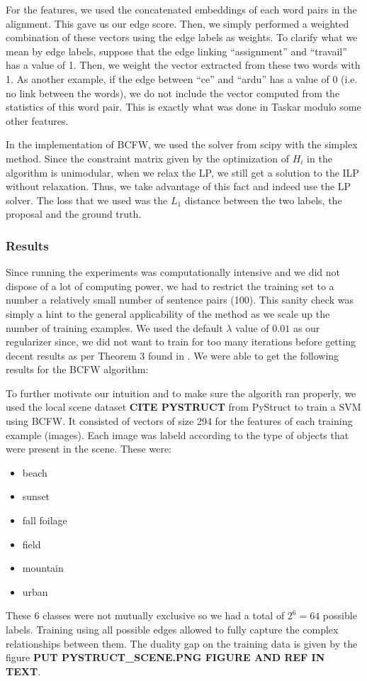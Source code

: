 For the features, we used the concatenated
embeddings of each word pairs in the alignment. This gave us our edge score.
Then, we simply performed a weighted combination of these vectors using the edge
labels as weights. To clarify what we mean by edge labels, suppose that the edge
linking ``assignment'' and ``travail'' has a value of 1. Then, we weight the
vector extracted from these two words with 1. As another example, if the edge
between ``ce'' and ``ardu'' has a value of 0 (i.e. no link between the words),
we do not include the vector computed from the statistics of this word pair.
This is exactly what was done in Taskar
\cite{taskarStructuredPredictionExtragradient} modulo some other features.

In the implementation of BCFW, we used the solver from scipy with the simplex
method. Since the constraint matrix given by the optimization of $H_i$ in the
algorithm is unimodular, when we relax the LP, we still get a solution to the
ILP without relaxation. Thus, we take advantage of this fact and indeed use the
LP solver. The loss that we used was the $L_1$
distance between the two labels, the proposal and the ground truth.

\subsubsection{Results}
Since running the experiments was computationally intensive and we did not dispose of a
lot of computing power, we had to restrict the training set to a number a relatively small
number of sentence pairs (100). This sanity check was simply a hint to the general applicability 
of the method as we scale up the number of training examples. We used the default $\lambda$ value
of $0.01$ as our regularizer since, we did not want to train for too many iterations before
getting decent results as per Theorem 3 found in
\citet{lacoste-julienBlockCoordinateFrankWolfeOptimization2013}. We were able to
get the following results for the BCFW algorithm:




To further motivate our intuition and to make sure the algorith ran properly, we used
the local scene dataset \textbf{CITE PYSTRUCT} from PyStruct to train a SVM using BCFW. It consisted of vectors
of size 294 for the features of each training example (images). Each image was labeld according
to the type of objects that were present in the scene. These were:
\begin{itemize}
  \item beach
  \item sunset
  \item fall foilage
  \item field
  \item mountain
  \item urban
\end{itemize}
These 6 classes were not mutually exclusive so we had a total of $2^6=64$ possible labels. Training using
all possible edges allowed to fully capture the complex relationships between them. The duality gap on the 
training data is given by the figure \textbf{PUT PYSTRUCT_SCENE.PNG FIGURE AND REF IN TEXT}.

